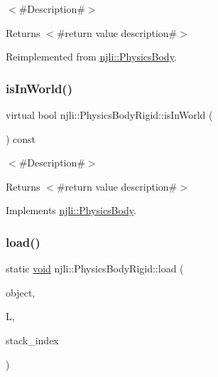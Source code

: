 $<$\#\+Description\#$>$

\begin{DoxyReturn}{Returns}
$<$\#return value description\#$>$ 
\end{DoxyReturn}


Reimplemented from \mbox{\hyperlink{classnjli_1_1_physics_body_ae8501b09e0eda9f0f82069c537f16663}{njli\+::\+Physics\+Body}}.

\mbox{\label{classnjli_1_1_physics_body_rigid_a0679c29d4447ee758cb84234731dfbdd}} 
\subsubsection{\texorpdfstring{is\+In\+World()}{isInWorld()}}
{\footnotesize\ttfamily virtual bool njli\+::\+Physics\+Body\+Rigid\+::is\+In\+World (\begin{DoxyParamCaption}{ }\end{DoxyParamCaption}) const\hspace{0.3cm}{\ttfamily [virtual]}}

$<$\#\+Description\#$>$

\begin{DoxyReturn}{Returns}
$<$\#return value description\#$>$ 
\end{DoxyReturn}


Implements \mbox{\hyperlink{classnjli_1_1_physics_body_a9f98398ebd273f305ffb8316908d8088}{njli\+::\+Physics\+Body}}.

\mbox{\label{classnjli_1_1_physics_body_rigid_af57a409d8e39b06aa74c0c742fe6ff22}} 
\subsubsection{\texorpdfstring{load()}{load()}}
{\footnotesize\ttfamily static \mbox{\hyperlink{_thread_8h_af1e856da2e658414cb2456cb6f7ebc66}{void}} njli\+::\+Physics\+Body\+Rigid\+::load (\begin{DoxyParamCaption}\item[{\mbox{\hyperlink{classnjli_1_1_physics_body_rigid}{Physics\+Body\+Rigid}} \&}]{object,  }\item[{lua\+\_\+\+State $\ast$}]{L,  }\item[{int}]{stack\+\_\+index }\end{DoxyParamCaption})\hspace{0.3cm}{\ttfamily [static]}}

